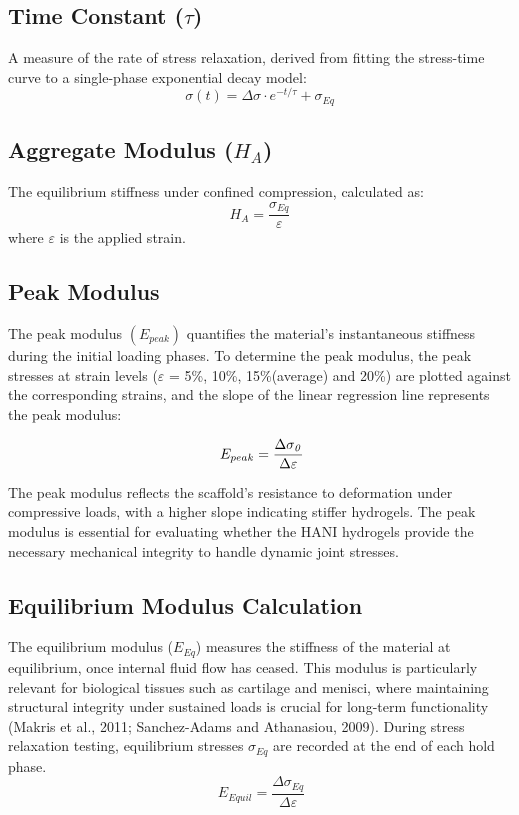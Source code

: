 \subsection{Time Constant ($\tau$)}
A measure of the rate of stress relaxation, derived from fitting the stress-time curve to a single-phase exponential decay model:
\begin{equation}
\sigma(t) = \Delta\sigma \cdot e^{-t/\tau} + \sigma_{Eq}
\end{equation}

\subsection{Aggregate Modulus ($H_A$)}
The equilibrium stiffness under confined compression, calculated as:
\begin{equation}
H_A = \frac{\sigma_{Eq}}{\varepsilon}
\end{equation}
where $\varepsilon$ is the applied strain.


\subsection{Peak Modulus}
The peak modulus $(E_{peak})$ quantifies the material's instantaneous stiffness during the initial loading phases. To determine the peak modulus, the peak stresses at strain levels ($\varepsilon$ = 5\%, 10\%, 15\%(average) and 20\%) are plotted against the corresponding strains, and the slope of the linear regression line represents the peak modulus:

\begin{equation}
\textit{} \ E_{peak} = \frac{\Delta\sigma_{\text{\textit{0}}}}{\Delta\varepsilon}
\end{equation}

\noindent The peak modulus reflects the scaffold's resistance to deformation under compressive loads, with a higher slope indicating stiffer hydrogels. The peak modulus is essential for evaluating whether the HANI hydrogels provide the necessary mechanical integrity to handle dynamic joint stresses.

\subsection{Equilibrium Modulus Calculation}
The equilibrium modulus ($E_{Eq}$) measures the stiffness of the material at equilibrium, once internal fluid flow has ceased. This modulus is particularly relevant for biological tissues such as cartilage and menisci, where maintaining structural integrity under sustained loads is crucial for long-term functionality (Makris et al., 2011; Sanchez-Adams and Athanasiou, 2009). During stress relaxation testing, equilibrium stresses $\sigma_{Eq}$ are recorded at the end of each hold phase.
\begin{equation}
 \  E_{Equil}=\frac{\Delta\sigma_{Eq}}{\Delta \varepsilon}
\end{equation}


